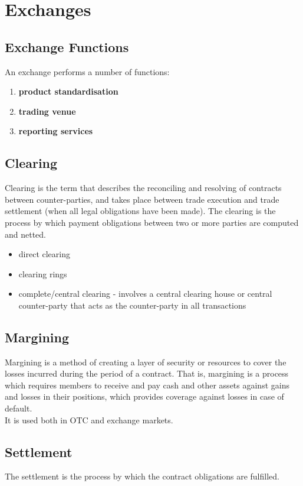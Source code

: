 \chapter{Exchanges}

\section{Exchange Functions}
An exchange performs a number of functions:
\begin{enumerate}
	\item \textbf{\color{blue}product standardisation}
	\item \textbf{\color{blue}trading venue}
	\item \textbf{\color{blue}reporting services}
\end{enumerate}


\section{Clearing}
Clearing is the term that describes the reconciling and resolving of contracts between counter-parties, and takes place between trade execution and trade settlement (when all legal obligations have been made).
The clearing is the process by which payment obligations between two or more parties are computed and netted.
\begin{itemize}
	\item direct clearing
	\item clearing rings
	\item complete/central clearing - involves a central clearing house or central counter-party that acts as the counter-party in all transactions
\end{itemize}


\section{Margining}
Margining is a method of creating a layer of security or resources to cover the losses incurred during the period of a contract. That is, margining is a process which requires members to receive and pay cash and other assets against gains and losses in their positions, which provides coverage against losses in case of default.\\
It is used both in OTC and exchange markets.

\section{Settlement}
The settlement is the process by which the contract obligations are fulfilled.

